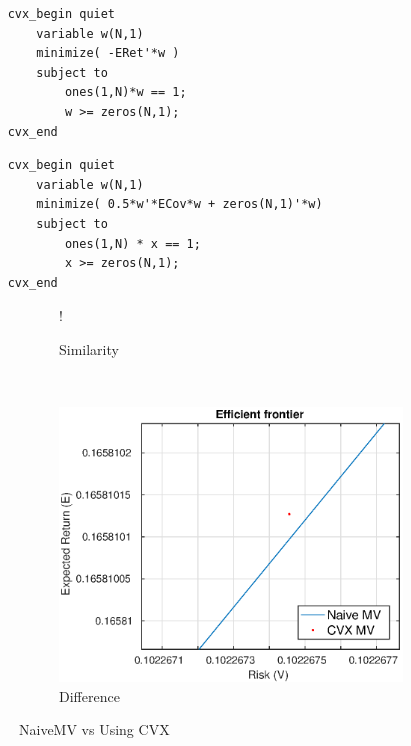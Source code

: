 \documentclass[11pt]{article}
\begin{document}
\vspace{0.5cm}

\begin{minipage}{.4\textwidth}
  	\begin{verbatim}
	cvx_begin quiet
		variable w(N,1)
		minimize( -ERet'*w )
		subject to
			ones(1,N)*w == 1;
			w >= zeros(N,1);
	cvx_end
	\end{verbatim}
\end{minipage}%
\begin{minipage}{.6\textwidth}
  	\begin{verbatim}
	cvx_begin quiet
		variable w(N,1)
		minimize( 0.5*w'*ECov*w + zeros(N,1)'*w)
		subject to
			ones(1,N) * x == 1;
			x >= zeros(N,1);
	cvx_end
	\end{verbatim}
\end{minipage}

\begin{figure}[!h]
    \centering 
   \begin{subfigure}[b]{0.30\textwidth}
     	\resizebox {\textwidth} {!} { }
     \caption{Similarity}
    \label{fig:q1-d-naive-v-cvx}
    \end{subfigure}
    ~
    \begin{subfigure}[b]{0.30\textwidth}
       	\includegraphics[scale=.5] {q1_d_naive_v_cvx_difference.eps}
       \caption{Difference}
        \label{fig:q1-d-naive-v-cvx-difference}
    \end{subfigure}
    \caption{NaiveMV vs Using CVX}\label{fig:naive_v_cvx}
\end{figure}
\end{document}
